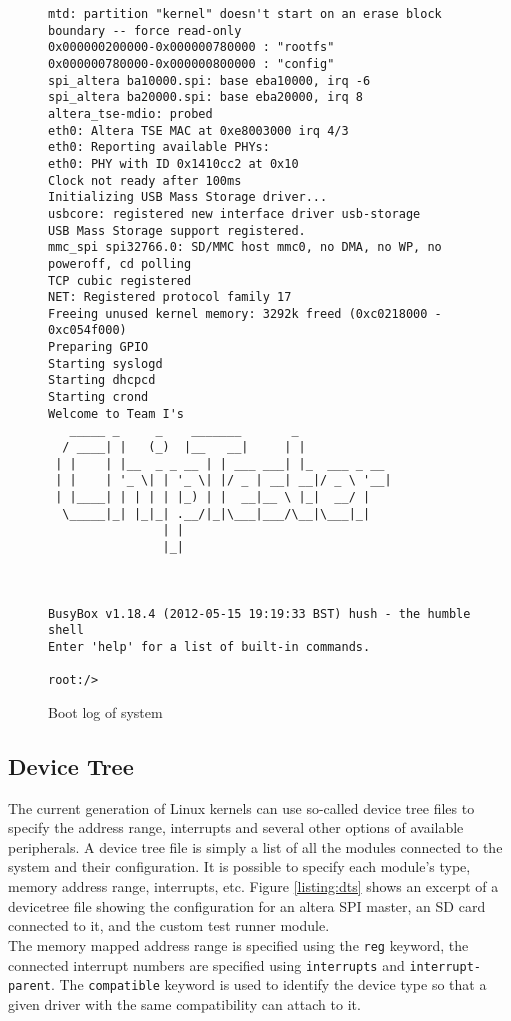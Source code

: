 \begin{figure}[h!]
\begin{lstlisting}
mtd: partition "kernel" doesn't start on an erase block boundary -- force read-only
0x000000200000-0x000000780000 : "rootfs"
0x000000780000-0x000000800000 : "config"
spi_altera ba10000.spi: base eba10000, irq -6
spi_altera ba20000.spi: base eba20000, irq 8
altera_tse-mdio: probed
eth0: Altera TSE MAC at 0xe8003000 irq 4/3
eth0: Reporting available PHYs:
eth0: PHY with ID 0x1410cc2 at 0x10
Clock not ready after 100ms
Initializing USB Mass Storage driver...
usbcore: registered new interface driver usb-storage
USB Mass Storage support registered.
mmc_spi spi32766.0: SD/MMC host mmc0, no DMA, no WP, no poweroff, cd polling
TCP cubic registered
NET: Registered protocol family 17
Freeing unused kernel memory: 3292k freed (0xc0218000 - 0xc054f000)
Preparing GPIO
Starting syslogd
Starting dhcpcd
Starting crond
Welcome to Team I's
   _____ _     _    _______       _             
  / ____| |   (_)  |__   __|     | |            
 | |    | |__  _ _ __ | | ___ ___| |_  ___ _ __ 
 | |    | '_ \| | '_ \| |/ _ | __| __|/ _ \ '__|
 | |____| | | | | |_) | |  __|__ \ |_|  __/ |   
  \_____|_| |_|_| .__/|_|\___|___/\__|\___|_|   
                | |                             
                |_|                      



BusyBox v1.18.4 (2012-05-15 19:19:33 BST) hush - the humble shell
Enter 'help' for a list of built-in commands.

root:/> 
\end{lstlisting}
\caption{Boot log of system}
\label{listing:bootlog}
\end{figure}


\subsection{Device Tree}
The current generation of Linux kernels can use so-called device tree files to specify the address range,
interrupts and several other options of available peripherals. A device tree file is simply a list
of all the modules connected to the system and their configuration. It is possible to specify each module's
type, memory address range, interrupts, etc. Figure \ref{listing:dts} shows an excerpt of a devicetree file showing the
configuration for an altera SPI master, an SD card connected to it, and the custom test runner module.
\\

The memory mapped address range is specified using the \texttt{reg} keyword, the connected interrupt numbers
are specified using \texttt{interrupts} and \texttt{interrupt-parent}. The \texttt{compatible} keyword is
used to identify the device type so that a given driver with the same compatibility can attach to it.

